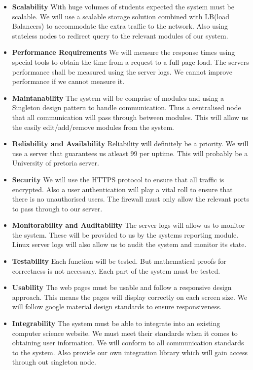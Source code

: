 
%

\begin{itemize}
	\item \textbf{Scalability}
		With huge volumes of students expected the system must be scalable. We will use a scalable storage solution combined with LB(load Balancers) to accommodate the extra traffic to the network. Also using stateless nodes to redirect query to the relevant modules of our system.
	\item \textbf{Performance Requirements}
		We will measure the response times using special tools to obtain the time from a request to a full page load. The servers performance shall be measured using the server logs. We cannot improve performance if we cannot measure it. 
	\item \textbf{Maintanability}
		The system will be comprise of modules and using a Singleton design pattern to handle communication. Thus a centralised node that all communication will pass through between modules. This will allow us the easily edit/add/remove modules from the system.
	\item \textbf{Reliability and Availability}
		Reliability will definitely be a priority. We will use a server that guarantees us atleast 99 per uptime. This will probably be a University of pretoria server.
	\item \textbf{Security}
		We will use the HTTPS protocol to ensure that all traffic is encrypted. Also a user authentication will play a vital roll to ensure that there is no unauthorised users. The firewall must only allow the relevant ports to pass through to our server. 
	\item \textbf{Monitorability and Auditability}
		The server logs will allow us to monitor the system. These will be provided to us by the systems reporting module. Linux server logs will also allow us to audit the system and monitor its state.
	\item \textbf{Testability}
		Each function will be tested. But mathematical proofs for correctness is not necessary. Each part of the system must be tested. 
	\item \textbf{Usability}
		The web pages must be usable and follow a responsive design approach. This means the pages will display correctly on each screen size. We will follow google material design standards to ensure responsiveness.
	\item \textbf{Integrability}
		The system must be able to integrate into an existing computer science website. We must meet their standards when it comes to obtaining user information. We will conform to all communication standards to the system. Also provide our own integration library which will gain access through out singleton node.
\end{itemize}

%
